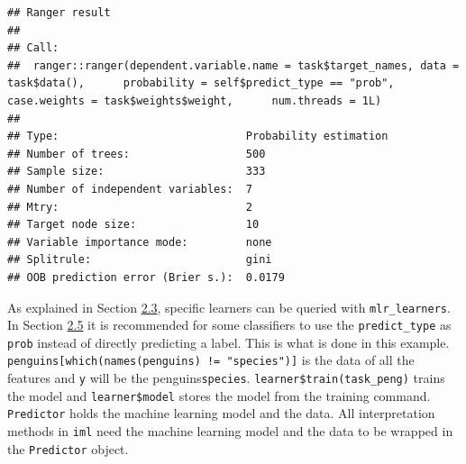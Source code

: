\documentclass[
]{scrbook}
\newenvironment{Shaded}{\begin{snugshade}}{\end{snugshade}}
\newcommand{\AttributeTok}[1]{\textcolor[rgb]{0.77,0.63,0.00}{#1}}
\newcommand{\FunctionTok}[1]{\textcolor[rgb]{0.00,0.00,0.00}{#1}}
\newcommand{\NormalTok}[1]{#1}
\newcommand{\OtherTok}[1]{\textcolor[rgb]{0.56,0.35,0.01}{#1}}
\newcommand{\SpecialCharTok}[1]{\textcolor[rgb]{0.00,0.00,0.00}{#1}}
\newcommand{\StringTok}[1]{\textcolor[rgb]{0.31,0.60,0.02}{#1}}
\renewenvironment{Shaded} {\begin{snugshade}\small} {\end{snugshade}}
\begin{document}
\begin{Shaded}
\end{Shaded}

\begin{verbatim}
## Ranger result
## 
## Call:
##  ranger::ranger(dependent.variable.name = task$target_names, data = task$data(),      probability = self$predict_type == "prob", case.weights = task$weights$weight,      num.threads = 1L) 
## 
## Type:                             Probability estimation 
## Number of trees:                  500 
## Sample size:                      333 
## Number of independent variables:  7 
## Mtry:                             2 
## Target node size:                 10 
## Variable importance mode:         none 
## Splitrule:                        gini 
## OOB prediction error (Brier s.):  0.0179
\end{verbatim}

\begin{Shaded}
\end{Shaded}

As explained in Section \href{https://mlr3book.mlr-org.com/learners.html}{2.3}, specific learners can be queried with \texttt{mlr\_learners}.
In Section \href{https://mlr3book.mlr-org.com/train-predict.html}{2.5} it is recommended for some classifiers to use the \texttt{predict\_type} as \texttt{prob} instead of directly predicting a label.
This is what is done in this example.
\texttt{penguins{[}which(names(penguins)\ !=\ "species"){]}} is the data of all the features and \texttt{y} will be the penguins\texttt{species}.
\texttt{learner\$train(task\_peng)} trains the model and \texttt{learner\$model} stores the model from the training command.
\texttt{Predictor} holds the machine learning model and the data.
All interpretation methods in \texttt{iml} need the machine learning model and the data to be wrapped in the \texttt{Predictor} object.
\end{document}
